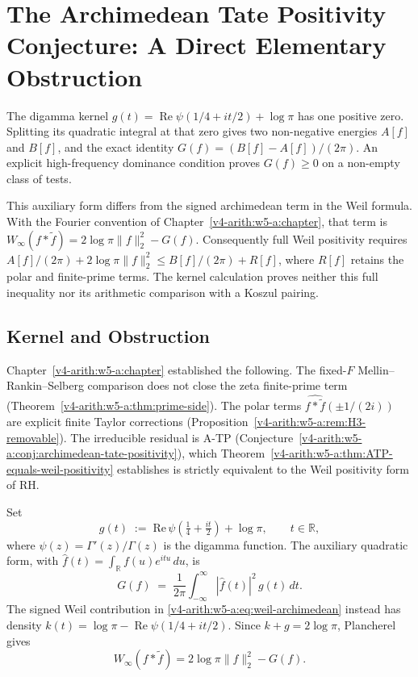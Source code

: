 \chapter{The Archimedean Tate Positivity Conjecture: A Direct Elementary Obstruction}
\label{v4-arith:w6-a:ATP-direct-obstruction}

The digamma kernel
\(g(t)=\operatorname{Re}\psi(1/4+it/2)+\log\pi\) has one positive
zero. Splitting its quadratic integral at that zero gives two
non-negative energies \(A[f]\) and \(B[f]\), and the exact identity
\(G(f)=(B[f]-A[f])/(2\pi)\). An explicit high-frequency dominance
condition proves \(G(f)\geq0\) on a non-empty class of tests.

This auxiliary form differs from the signed archimedean term in the
Weil formula. With the Fourier convention of
Chapter~\ref{v4-arith:w5-a:chapter}, that term is
\(W_\infty(f*\widetilde f)=2\log\pi\|f\|_2^2-G(f)\).
Consequently full Weil positivity requires
\(A[f]/(2\pi)+2\log\pi\|f\|_2^2\leq B[f]/(2\pi)+R[f]\),
where \(R[f]\) retains the polar and finite-prime terms.
The kernel calculation proves neither this full inequality nor its
arithmetic comparison with a Koszul pairing.

\section{Kernel and Obstruction}
\label{v4-arith:w6-a:context}

Chapter~\ref{v4-arith:w5-a:chapter} established the following. The
fixed-\(F\) Mellin--Rankin--Selberg comparison does not close the zeta
finite-prime term
(Theorem~\ref{v4-arith:w5-a:thm:prime-side}). The polar terms
\(\widehat{f*\widetilde{f}}(\pm 1/(2i))\) are explicit finite Taylor
corrections (Proposition~\ref{v4-arith:w5-a:rem:H3-removable}). The irreducible
residual is A-TP
(Conjecture~\ref{v4-arith:w5-a:conj:archimedean-tate-positivity}), which
Theorem~\ref{v4-arith:w5-a:thm:ATP-equals-weil-positivity} establishes is
strictly equivalent to the Weil positivity form of RH.

\begin{definition}
\label{v4-arith:w6-a:def:g}
Set
\begin{equation}
\label{v4-arith:w6-a:eq:g-definition}
g(t)\;:=\;\mathrm{Re}\,\psi\!\left(\tfrac{1}{4}+\tfrac{it}{2}\right)+\log\pi,
\qquad t\in\mathbb{R},
\end{equation}
where \(\psi(z)=\Gamma'(z)/\Gamma(z)\) is the digamma function. The auxiliary quadratic form, with
\(\widehat f(t)=\int_{\mathbb R}f(u)e^{itu}\,du\), is
\begin{equation}
\label{v4-arith:w6-a:eq:W-arch-as-g}
G(f)
\;=\;\frac{1}{2\pi}\int_{-\infty}^{\infty}|\widehat{f}(t)|^{2}\,g(t)\,dt.
\end{equation}
The signed Weil contribution in
\eqref{v4-arith:w5-a:eq:weil-archimedean} instead has density
\(k(t)=\log\pi-\operatorname{Re}\psi(1/4+it/2)\). Since
\(k+g=2\log\pi\), Plancherel gives
\[
W_\infty(f*\widetilde f)=2\log\pi\|f\|_2^2-G(f).
\]
\end{definition}

